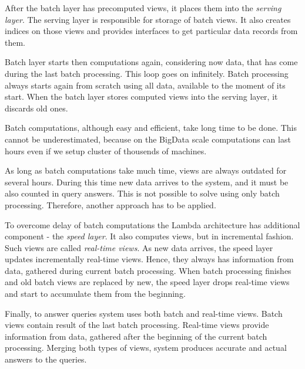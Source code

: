 After the batch layer has precomputed views, it places them into the \textit{serving layer}.
The serving layer is responsible for storage of batch views.
It also creates indices on those views and provides interfaces to get particular data records from them.

Batch layer starts then computations again, considering now data, that has come during the last batch processing.
This loop goes on infinitely.
Batch processing always starts again from scratch using all data, available to the moment of its start.
When the batch layer stores computed views into the serving layer, it discards old ones.

Batch computations, although easy and efficient, take long time to be done.
This cannot be underestimated, because on the BigData scale computations can last hours even if we setup cluster of thousends of machines.

As long as batch computations take much time, views are always outdated for several hours.
During this time new data arrives to the system, and it must be also counted in query answers.
This is not possible to solve using only batch processing.
Therefore, another approach has to be applied.

To overcome delay of batch computations the Lambda architecture has additional component - the \textit{speed layer}.
It also computes views, but in incremental fashion.
Such views are called \textit{real-time views}.
As new data arrives, the speed layer updates incrementally real-time views.
Hence, they always has information from data, gathered during current batch processing.
When batch processing finishes and old batch views are replaced by new, the speed layer drops real-time views and start to accumulate them from the beginning.

Finally, to answer queries system uses both batch and real-time views.
Batch views contain result of the last batch processing.
Real-time views provide information from data, gathered after the beginning of the current batch processing.
Merging both types of views, system produces accurate and actual answers to the queries.